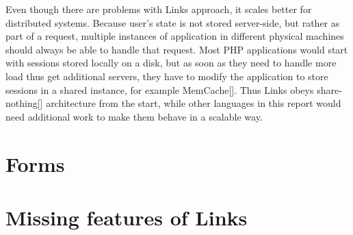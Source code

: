 Even though there are problems with Links approach, it scales better for distributed systems. Because user's state is not stored server-side, but rather as part of a request, multiple instances of application in different physical machines should always be able to handle that request. Most PHP applications would start with sessions stored locally on a disk, but as soon as they need to handle more load thus get additional servers, they have to modify the application to store sessions in a shared instance, for example MemCache[]. Thus Links obeys share-nothing[] architecture from the start, while other languages in this report would need additional work to make them behave in a scalable way.

\section{Forms}

\section{Missing features of Links}
